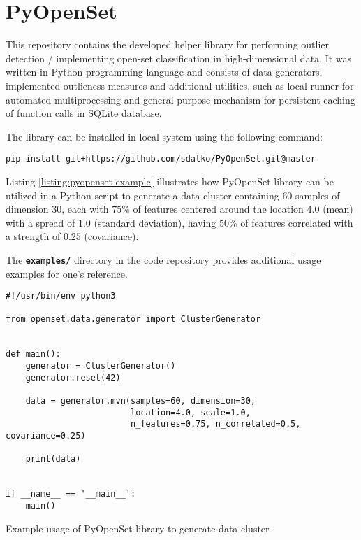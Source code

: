 \section{PyOpenSet}
\label{section:pyopenset}

This repository contains the developed helper library for performing outlier detection / implementing open-set classification in high-dimensional data. It was written in Python programming language and consists of data generators, implemented outlieness measures and additional utilities, such as local runner for automated multiprocessing and general-purpose mechanism for persistent caching of function calls in SQLite database.

The library can be installed in local system using the following command:
\vspace{-\parskip}
\begin{verbatim}
pip install git+https://github.com/sdatko/PyOpenSet.git@master
\end{verbatim}

Listing \ref{listing:pyopenset-example} illustrates how PyOpenSet library can be utilized in a Python script to generate a data cluster containing $60$ samples of dimension $30$, each with $75\%$ of features centered around the location $4.0$ (mean) with a spread of $1.0$ (standard deviation), having $50\%$ of features correlated with a strength of $0.25$ (covariance).

The \texttt{\textbf{examples/}} directory in the code repository provides additional usage examples for one's reference.

\begin{listing}[t]
    \begin{verbatim}
#!/usr/bin/env python3

from openset.data.generator import ClusterGenerator


def main():
    generator = ClusterGenerator()
    generator.reset(42)

    data = generator.mvn(samples=60, dimension=30,
                         location=4.0, scale=1.0,
                         n_features=0.75, n_correlated=0.5, covariance=0.25)

    print(data)


if __name__ == '__main__':
    main()
    \end{verbatim}
    \caption{Example usage of PyOpenSet library to generate data cluster}
    \label{listing:pyopenset-example}
\end{listing}
